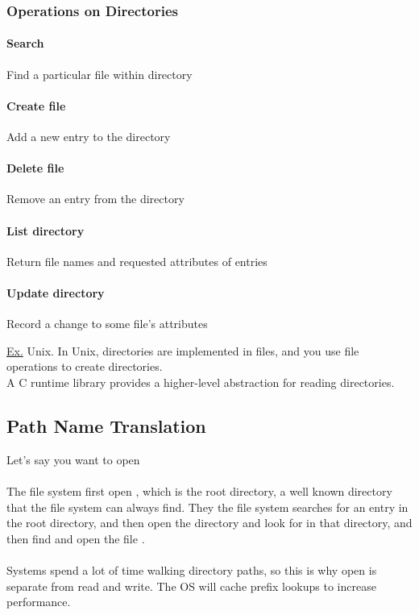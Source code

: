 \documentclass{article}
\begin{document}
\subsubsection{Operations on Directories}

\paragraph{Search} Find a particular file within directory
\paragraph{Create file} Add a new entry to the directory
\paragraph{Delete file} Remove an entry from the directory
\paragraph{List directory} Return file names and requested attributes of entries
\paragraph{Update directory} Record a change to some file's attributes

\underline{Ex.} Unix. In Unix, directories are implemented in files, and you use file operations to create directories.\\
A C runtime library provides a higher-level abstraction for reading directories.

\subsection{Path Name Translation}

Let's say you want to open \\
\\
The file system first open \codeword{/}, which is the root directory, a well known directory that the file system can always find. They the file system searches for an entry  in the root directory, and then open the  directory and look for  in that directory, and then find and open the file .\\
\\
Systems spend a lot of time walking directory paths, so this is why open is separate from read and write. The OS will cache prefix lookups to increase performance.
\end{document}
